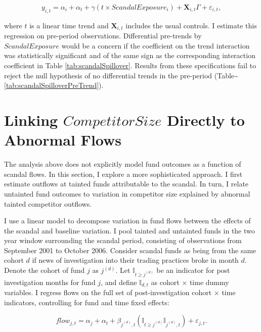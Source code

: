 \documentclass[openany]{book}
\theoremstyle{definition}
\theoremstyle{definition}
\theoremstyle{definition}
\theoremstyle{remark}
\begin{document}
\begin{equation}
y_{i,t} = \alpha_i + \alpha_t + \gamma \left(t \times ScandalExposure_i\right) + \mathbf{X}_{i,t}\Gamma + \varepsilon_{i,t},
\end{equation}

where \(t\) is a linear time trend and \(\mathbf{X}_{i,t}\) includes the
usual controls. I estimate this regression on pre-period observations.
Differential pre-trends by \(ScandalExposure\) would be a concern if the
coefficient on the trend interaction was statistically significant and
of the same sign as the corresponding interaction coefficient in Table
\ref{tab:scandalSpillover}. Results from these specifications fail to
reject the null hypothesis of no differential trends in the pre-period
(Table\textasciitilde{}\ref{tab:scandalSpilloverPreTrend}).

\section{\texorpdfstring{Linking \(CompetitorSize\) Directly to Abnormal
Flows}{Linking CompetitorSize Directly to Abnormal Flows}}\label{sec:linkFlows}

The analysis above does not explicitly model fund outcomes as a function
of scandal flows. In this section, I explore a more sophisticated
approach. I first estimate outflows at tainted funds attributable to the
scandal. In turn, I relate untainted fund outcomes to variation in
competitor size explained by abnormal tainted competitor outflows.

I use a linear model to decompose variation in fund flows between the
effects of the scandal and baseline variation. I pool tainted and
untainted funds in the two year window surrounding the scandal period,
consisting of observations from September 2001 to October 2006. Consider
scandal funds as being from the same cohort \(d\) if news of
investigation into their trading practices broke in month \(d\). Denote
the cohort of fund \(j\) as \(j^{(d)}\). Let
\(\mathbb{I}_{t\geq j^{(d)}}\) be an indicator for post investigation
months for fund \(j\), and define \(\mathbb{I}_{d,t}\) as cohort
\(\times\) time dummy variables. I regress flows on the full set of
post-investigation cohort \(\times\) time indicators, controlling for
fund and time fixed effects:

\begin{equation}
flow_{j,t}=\alpha_j+\alpha_t +\beta_{j^{(d)},t} \left( \mathbb{I}_{t\geq j^{(d)}}\mathbb{I}_{j^{(d)},t} \right) + \varepsilon_{j,t}.
\label{eq:cohortReg}
\end{equation}
\end{document}
